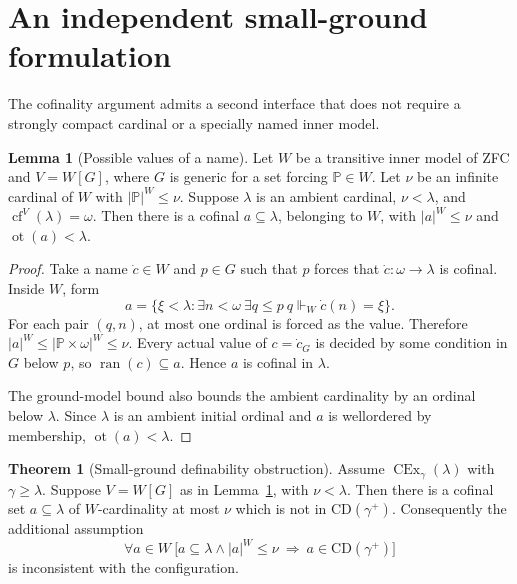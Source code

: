 \documentclass[11pt,letterpaper]{article}
\theoremstyle{definition}
\newtheorem{theorem}[definition]{Theorem}
\newtheorem{lemma}[definition]{Lemma}
\newcommand{\CEx}{\operatorname{CEx}}
\newcommand{\cf}{\operatorname{cf}}
\newcommand{\ot}{\operatorname{ot}}
\newcommand{\CD}{\mathrm{CD}}
\newcommand{\ran}{\operatorname{ran}}
\begin{document}
\section{An independent small-ground formulation}\label{sec:ground}

The cofinality argument admits a second interface that does not require a strongly compact cardinal or a specially named inner model.

\begin{lemma}[Possible values of a name]\label{lem:small-ground}
Let $W$ be a transitive inner model of ZFC and $V=W[G]$, where $G$ is generic for a set forcing $\mathbb P\in W$. Let $\nu$ be an infinite cardinal of $W$ with $|\mathbb P|^W\leq\nu$. Suppose $\lambda$ is an ambient cardinal, $\nu<\lambda$, and $\cf^V(\lambda)=\omega$. Then there is a cofinal $a\subseteq\lambda$, belonging to $W$, with $|a|^W\leq\nu$ and $\ot(a)<\lambda$.
\end{lemma}

\begin{proof}
Take a name $\dot c\in W$ and $p\in G$ such that $p$ forces that $\dot c:\omega\to\lambda$ is cofinal. Inside $W$, form
\[
 a=\{\xi<\lambda:\exists n<\omega\ \exists q\leq p\
                      q\Vdash_W\dot c(n)=\xi\}.
\]
For each pair $(q,n)$, at most one ordinal is forced as the value. Therefore $|a|^W\leq|\mathbb P\times\omega|^W\leq\nu$. Every actual value of $c=\dot c_G$ is decided by some condition in $G$ below $p$, so $\ran(c)\subseteq a$. Hence $a$ is cofinal in $\lambda$.

The ground-model bound also bounds the ambient cardinality by an ordinal below $\lambda$. Since $\lambda$ is an ambient initial ordinal and $a$ is wellordered by membership, $\ot(a)<\lambda$.
\end{proof}

\begin{theorem}[Small-ground definability obstruction]\label{thm:ground}
Assume $\CEx_\gamma(\lambda)$ with $\gamma\geq\lambda$. Suppose $V=W[G]$ as in Lemma~\ref{lem:small-ground}, with $\nu<\lambda$. Then there is a cofinal set $a\subseteq\lambda$ of $W$-cardinality at most $\nu$ which is not in $\CD(\gamma^+)$. Consequently the additional assumption
\begin{equation}\label{eq:ground-rep}
 \forall a\in W\ 
 \bigl[a\subseteq\lambda\wedge |a|^W\leq\nu
                  \ \Longrightarrow\ a\in\CD(\gamma^+)\bigr]
\end{equation}
is inconsistent with the configuration.
\end{theorem}
\end{document}
